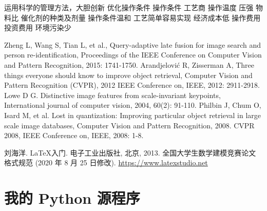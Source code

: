 \documentclass[bwprint]{gmcmthesis}
\begin{document}
运用科学的管理方法，大胆创新 优化操作条件 操作条件 工艺商
操作温度 压强 物料比 催化剂的种类及剂量 
操作条件温和 工艺简单容易实现 经济成本低 操作费用 投资费用 环境污染少 

\newpage



\begin{thebibliography}{99}  
Zheng L, Wang S, Tian L, et al., Query-adaptive late fusion for image search and person re-identification, Proceedings of the IEEE Conference on Computer Vision and Pattern Recognition, 2015: 1741-1750.  
Arandjelović R, Zisserman A, Three things everyone should know to improve object retrieval, Computer Vision and Pattern Recognition (CVPR), 2012 IEEE Conference on, IEEE, 2012: 2911-2918.  
Lowe D G. Distinctive image features from scale-invariant keypoints, International journal of computer vision, 2004, 60(2): 91-110.  
Philbin J, Chum O, Isard M, et al. Lost in quantization: Improving particular object retrieval in large scale image databases, Computer Vision and Pattern Recognition, 2008. CVPR 2008, IEEE Conference on, IEEE, 2008: 1-8.  
\end{thebibliography}



% 
% 


\begin{thebibliography}{9}%
    刘海洋.
    \newblock \LaTeX {}入门\allowbreak[J].
    \newblock 电子工业出版社, 北京, 2013.
    全国大学生数学建模竞赛论文格式规范 (2020 年 8 月 25 日修改).
     \url{https://www.latexstudio.net}
\end{thebibliography}






\newpage
\appendix
\section{我的 Python 源程序}
\begin{lstlisting}[language=Python]%设置不同语言即可。



 \end{lstlisting}
\end{document}
